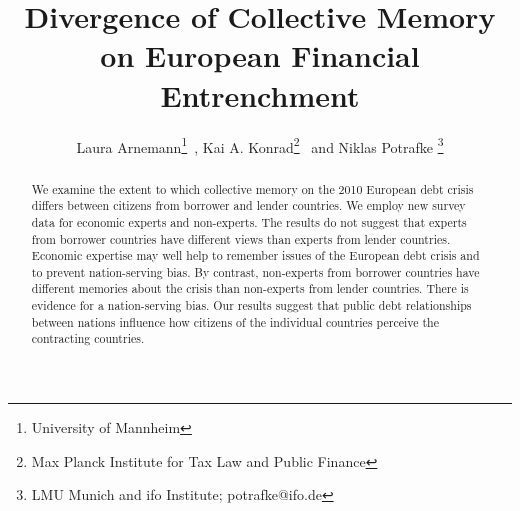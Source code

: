 \documentclass[12pt]{article}
\begin{document}
\title{Divergence of Collective Memory on European Financial Entrenchment}
\author{Laura Arnemann\textsuperscript{}\thanks{\noindent\textsuperscript{}University of Mannheim}\ , Kai A. Konrad\textsuperscript{}\thanks{\noindent\textsuperscript{}Max Planck Institute for Tax Law and Public Finance} \ and Niklas Potrafke \textsuperscript{}\thanks{\noindent\textsuperscript{}LMU Munich and ifo Institute; potrafke@ifo.de}}
\maketitle

\begin{abstract}
We examine the extent to which collective memory on the 2010 European debt crisis differs between citizens from borrower and lender countries. We employ new survey data for economic experts and non-experts. The results do not suggest that experts from borrower countries have different views than experts from lender countries. Economic expertise may well help to remember issues of the European debt crisis and to prevent nation-serving bias. By contrast, non-experts from borrower countries have different memories about the crisis than non-experts from lender countries. There is evidence for a nation-serving bias. Our results suggest that public debt relationships between nations influence how citizens of the individual countries perceive the contracting countries.
\end{abstract}
\clearpage






%
%


\clearpage




\clearpage


\end{document}
